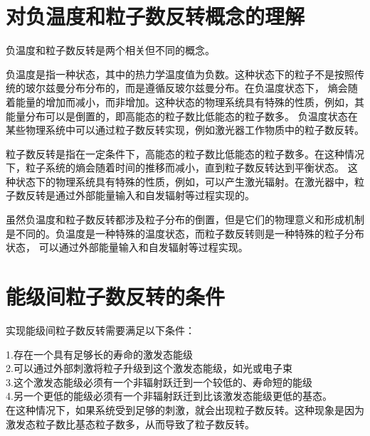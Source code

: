 \documentclass[12pt, a4paper, oneside]{article}
\begin{document}
\begin{spacing}{2.0}
\section{对负温度和粒子数反转概念的理解}
负温度和粒子数反转是两个相关但不同的概念。

负温度是指一种状态，其中的热力学温度值为负数。这种状态下的粒子不是按照传统的玻尔兹曼分布分布的，而是遵循反玻尔兹曼分布。在负温度状态下，
熵会随着能量的增加而减小，而非增加。这种状态的物理系统具有特殊的性质，例如，其能量分布可以是倒置的，即高能态的粒子数比低能态的粒子数多。
负温度状态在某些物理系统中可以通过粒子数反转实现，例如激光器工作物质中的粒子数反转。

粒子数反转是指在一定条件下，高能态的粒子数比低能态的粒子数多。在这种情况下，粒子系统的熵会随着时间的推移而减小，直到粒子数反转达到平衡状态。
这种状态下的物理系统具有特殊的性质，例如，可以产生激光辐射。在激光器中，粒子数反转是通过外部能量输入和自发辐射等过程实现的。

虽然负温度和粒子数反转都涉及粒子分布的倒置，但是它们的物理意义和形成机制是不同的。负温度是一种特殊的温度状态，而粒子数反转则是一种特殊的粒子分布状态，
可以通过外部能量输入和自发辐射等过程实现。
\section{能级间粒子数反转的条件}
实现能级间粒子数反转需要满足以下条件：

1.存在一个具有足够长的寿命的激发态能级\\
2.可以通过外部刺激将粒子升级到这个激发态能级，如光或电子束\\
3.这个激发态能级必须有一个非辐射跃迁到一个较低的、寿命短的能级\\
4.另一个更低的能级必须有一个非辐射跃迁到比该激发态能级更低的基态。\\
在这种情况下，如果系统受到足够的刺激，就会出现粒子数反转。这种现象是因为激发态粒子数比基态粒子数多，从而导致了粒子数反转。

\end{spacing}
\end{document}
